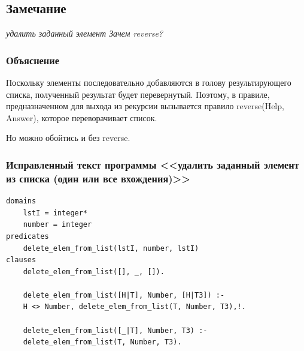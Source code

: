 \documentclass[a4paper,12pt]{article}
\begin{document}
	\subsection*{Замечание}
	
	\textit{удалить заданный элемент Зачем reverse?}
	
	\subsubsection*{Объяснение}
	
	Поскольку элементы последовательно добавляются в голову результирующего списка, полученный результат будет перевернутый. Поэтому, в правиле, предназначенном для выхода из рекурсии вызывается правило reverse(Help, Answer), которое переворачивает список.
	
	Но можно обойтись и без reverse.
	
	\subsubsection*{Исправленный текст программы <<удалить заданный элемент из списка (один или все вхождения)>>}
	
	\begin{verbatim}
domains
	lstI = integer*
	number = integer
predicates
	delete_elem_from_list(lstI, number, lstI)
clauses
	delete_elem_from_list([], _, []).
	
	delete_elem_from_list([H|T], Number, [H|T3]) :-
	H <> Number, delete_elem_from_list(T, Number, T3),!.
	
	delete_elem_from_list([_|T], Number, T3) :-
	delete_elem_from_list(T, Number, T3).
	\end{verbatim}
	
\end{document}
